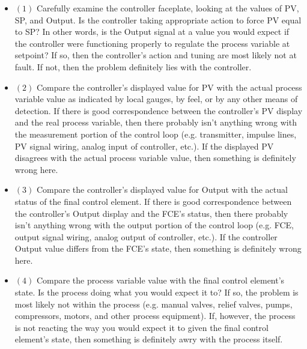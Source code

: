 \begin{itemize}
\item{$(1)$}  Carefully examine the controller faceplate, looking at the values of PV, SP, and Output.  Is the controller taking appropriate action to force PV equal to SP?  In other words, is the Output signal at a value you would expect if the controller were functioning properly to regulate the process variable at setpoint?  If so, then the controller's action and tuning are most likely not at fault.  If not, then the problem definitely lies with the controller.
\item{$(2)$}  Compare the controller's displayed value for PV with the actual process variable value as indicated by local gauges, by feel, or by any other means of detection.  If there is good correspondence between the controller's PV display and the real process variable, then there probably isn't anything wrong with the measurement portion of the control loop (e.g. transmitter, impulse lines, PV signal wiring, analog input of controller, etc.).  If the displayed PV disagrees with the actual process variable value, then something is definitely wrong here.
\item{$(3)$}  Compare the controller's displayed value for Output with the actual status of the final control element.  If there is good correspondence between the controller's Output display and the FCE's status, then there probably isn't anything wrong with the output portion of the control loop (e.g. FCE, output signal wiring, analog output of controller, etc.).  If the controller Output value differs from the FCE's state, then something is definitely wrong here.
\item{$(4)$}  Compare the process variable value with the final control element's state.  Is the process doing what you would expect it to?  If so, the problem is most likely not within the process (e.g. manual valves, relief valves, pumps, compressors, motors, and other process equipment).  If, however, the process is not reacting the way you would expect it to given the final control element's state, then something is definitely awry with the process itself.
\end{itemize}
















